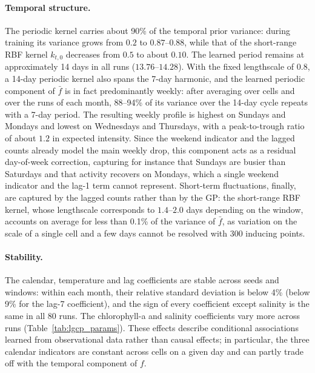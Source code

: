 \paragraph{Temporal structure.}
The periodic kernel carries about 90\% of the temporal prior variance: during training its variance grows from $0.2$ to $0.87$--$0.88$, while that of the short-range RBF kernel $k_{t,0}$ decreases from $0.5$ to about $0.10$. The learned period remains at approximately 14 days in all runs ($13.76$--$14.28$). With the fixed lengthscale of $0.8$, a 14-day periodic kernel also spans the 7-day harmonic, and the learned periodic component of $\bar f$ is in fact predominantly weekly: after averaging over cells and over the runs of each month, 88--94\% of its variance over the 14-day cycle repeats with a 7-day period. The resulting weekly profile is highest on Sundays and Mondays and lowest on Wednesdays and Thursdays, with a peak-to-trough ratio of about $1.2$ in expected intensity. Since the weekend indicator and the lagged counts already model the main weekly drop, this component acts as a residual day-of-week correction, capturing for instance that Sundays are busier than Saturdays and that activity recovers on Mondays, which a single weekend indicator and the lag-1 term cannot represent. Short-term fluctuations, finally, are captured by the lagged counts rather than by the GP: the short-range RBF kernel, whose lengthscale corresponds to $1.4$--$2.0$ days depending on the window, accounts on average for less than 0.1\% of the variance of $\bar f$, as variation on the scale of a single cell and a few days cannot be resolved with 300 inducing points.

\paragraph{Stability.}
The calendar, temperature and lag coefficients are stable across seeds and windows: within each month, their relative standard deviation is below 4\% (below 9\% for the lag-7 coefficient), and the sign of every coefficient except salinity is the same in all 80 runs. The chlorophyll-a and salinity coefficients vary more across runs (Table~\ref{tab:lgcp_params}). These effects describe conditional associations learned from observational data rather than causal effects; in particular, the three calendar indicators are constant across cells on a given day and can partly trade off with the temporal component of $f$.
